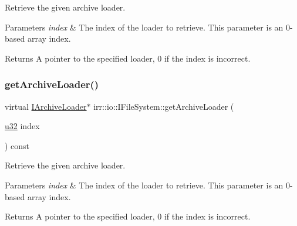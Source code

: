 Retrieve the given archive loader. 


\begin{DoxyParams}{Parameters}
{\em index} & The index of the loader to retrieve. This parameter is an 0-\/based array index. \\
\hline
\end{DoxyParams}
\begin{DoxyReturn}{Returns}
A pointer to the specified loader, 0 if the index is incorrect. 
\end{DoxyReturn}
\mbox{\label{classirr_1_1io_1_1IFileSystem_a175208d74556d1a0e4fe7400bbc65d7b}} 
\subsubsection{\texorpdfstring{get\+Archive\+Loader()}{getArchiveLoader()}\hspace{0.1cm}{\footnotesize\ttfamily [2/2]}}
{\footnotesize\ttfamily virtual \hyperlink{classirr_1_1io_1_1IArchiveLoader}{I\+Archive\+Loader}$\ast$ irr\+::io\+::\+I\+File\+System\+::get\+Archive\+Loader (\begin{DoxyParamCaption}\item[{\hyperlink{namespaceirr_a0416a53257075833e7002efd0a18e804}{u32}}]{index }\end{DoxyParamCaption}) const\hspace{0.3cm}{\ttfamily [pure virtual]}}



Retrieve the given archive loader. 


\begin{DoxyParams}{Parameters}
{\em index} & The index of the loader to retrieve. This parameter is an 0-\/based array index. \\
\hline
\end{DoxyParams}
\begin{DoxyReturn}{Returns}
A pointer to the specified loader, 0 if the index is incorrect. 
\end{DoxyReturn}
\mbox{\label{classirr_1_1io_1_1IFileSystem_a4235989e4ec21c78f1fd1ca861980c6c}} 
